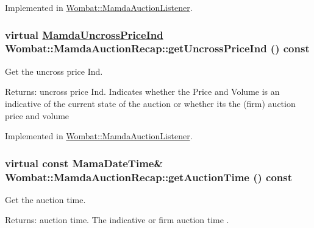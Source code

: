 Implemented in \hyperlink{classWombat_1_1MamdaAuctionListener_f6f979ad6d52cb722c975cbc0e5fd177}{Wombat::Mamda\-Auction\-Listener}.\hypertarget{classWombat_1_1MamdaAuctionRecap_867a8e076b348cc2492faeb251886cc1}{
\subsubsection[getUncrossPriceInd]{\setlength{\rightskip}{0pt plus 5cm}virtual \hyperlink{namespaceWombat_4f0ec767cbe150ee160f65e719e76226}{Mamda\-Uncross\-Price\-Ind} Wombat::Mamda\-Auction\-Recap::get\-Uncross\-Price\-Ind () const}}
\label{classWombat_1_1MamdaAuctionRecap_867a8e076b348cc2492faeb251886cc1}


Get the uncross price Ind. 

\begin{Desc}
\item[Returns:]uncross price Ind. Indicates whether the Price and Volume is an indicative of the current state of the auction or whether its the (firm) auction price and volume \end{Desc}


Implemented in \hyperlink{classWombat_1_1MamdaAuctionListener_e42ba9609a3c40772a5cc3b89d5c5a93}{Wombat::Mamda\-Auction\-Listener}.\hypertarget{classWombat_1_1MamdaAuctionRecap_29766366c4a151a36917987874e63d90}{
\subsubsection[getAuctionTime]{\setlength{\rightskip}{0pt plus 5cm}virtual const Mama\-Date\-Time\& Wombat::Mamda\-Auction\-Recap::get\-Auction\-Time () const}}
\label{classWombat_1_1MamdaAuctionRecap_29766366c4a151a36917987874e63d90}


Get the auction time. 

\begin{Desc}
\item[Returns:]auction time. The indicative or firm auction time . \end{Desc}



